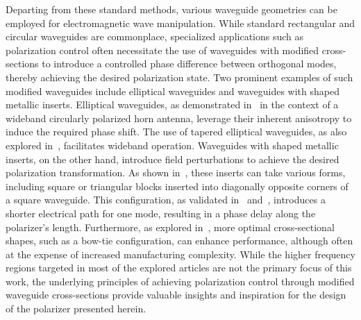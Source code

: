 \documentclass[11pt,a4paper,twoside,openany]{report}
\begin{document}
Departing from these standard methods, various waveguide geometries can be employed for electromagnetic wave manipulation. While standard rectangular and circular waveguides are commonplace, specialized applications such as polarization control often necessitate the use of waveguides with modified cross-sections to introduce a controlled phase difference between orthogonal modes, thereby achieving the desired polarization state. Two prominent examples of such modified waveguides include elliptical waveguides and waveguides with shaped metallic inserts. Elliptical waveguides, as demonstrated in~\parencite{yu-et-al:a-wideband-circularly-polarized-horn-antenna-with-a-tapered-elliptical-waveguide-polarizer} in the context of a wideband circularly polarized horn antenna, leverage their inherent anisotropy to induce the required phase shift. The use of tapered elliptical waveguides, as also explored in~\parencite{yu-et-al:a-wideband-circularly-polarized-horn-antenna-with-a-tapered-elliptical-waveguide-polarizer}, facilitates wideband operation. Waveguides with shaped metallic inserts, on the other hand, introduce field perturbations to achieve the desired polarization transformation. As shown in~\parencite{rud-shpachenko:polarizers-on-sections-of-square-waveguides-with-inner-corner-ridges,bhardwaj-volakis:hexagonal-waveguides-new-class-of-waveguides-for-mmwave-circularly-polarized-horns,bhardwaj-volakis:hexagonal-waveguide-based-circularly-polarized-horn-antennas-for-submmwave-terahertz-band,bhardwaj-volakis:circularly-polarized-horn-antennas-for-terahertz-communications-using-differential-mode-dispersion-in-hexagonal-waveguides}, these inserts can take various forms, including square or triangular blocks inserted into diagonally opposite corners of a square waveguide. This configuration, as validated in~\parencite{rud-shpachenko:polarizers-on-sections-of-square-waveguides-with-inner-corner-ridges} and~\parencite{bhardwaj-volakis:hexagonal-waveguides-new-class-of-waveguides-for-mmwave-circularly-polarized-horns}, introduces a shorter electrical path for one mode, resulting in a phase delay along the polarizer's length. Furthermore, as explored in~\parencite{garcia-marin-masa-campos:bowtie-shaped-radiating-element-for-single-and-dual-circular-polarization}, more optimal cross-sectional shapes, such as a bow-tie configuration, can enhance performance, although often at the expense of increased manufacturing complexity. While the higher frequency regions targeted in most of the explored articles are not the primary focus of this work, the underlying principles of achieving polarization control through modified waveguide cross-sections provide valuable insights and inspiration for the design of the polarizer presented herein.
\end{document}
